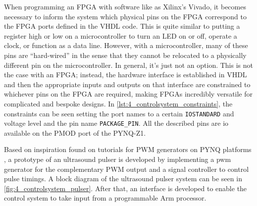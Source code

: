When programming an FPGA with software like as Xilinx's Vivado, it becomes necessary to inform the system which physical pins on the FPGA correspond to the FPGA ports defined in the VHDL code. This is quite similar to putting a register high or low on a microcontroller to turn an LED on or off, operate a clock, or function as a data line. However, with a microcontroller, many of these pins are \enquote{hard-wired} in the sense that they cannot be relocated to a physically different pin on the microcontroller. In general, it's just not an option. This is not the case with an FPGA; instead, the hardware interface is established in VHDL and then the appropriate inputs and outputs on that interface are constrained to whichever pins on the FPGA are required, making FPGAs incredibly versatile for complicated and bespoke designs. In \cref{lst:4_controlsystem_constraints}, the constraints can be seen setting the port names to a certain \texttt{IOSTANDARD} and voltage level and the pin name \texttt{PACKAGE\_PIN}. All the described pins are \gls{io} available on the PMOD port of the PYNQ-Z1.

Based on inspiration found on tutorials for PWM generators on PYNQ platforms \cite{jan_cumps,vhdl_pwm_gen}, a prototype of an ultrasound pulser is developed by implementing a \gls{pwm} generator for the complementary PWM output and a signal controller to control pulse timings. A block diagram of the ultrasound pulser system can be seen in \cref{fig:4_controlsystem_pulser}. After that, an interface is developed to enable the control system to take input from a programmable Arm processor.

